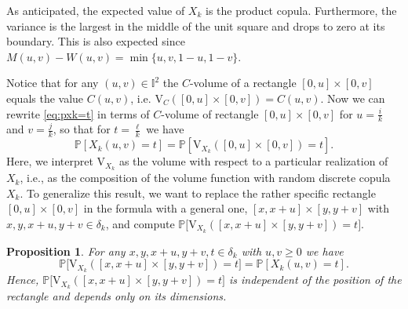 \documentclass[12pt,a4paper]{amsart}
\newtheorem{proposition}[theorem]{Proposition}
\theoremstyle{definition}
\newcommand{\II}{\mathbb{I}}
\newcommand{\dk}{\delta_k}
\newcommand{\PP}{\mathbb{P}}
\newcommand{\vol}{\mathrm{V}}
\begin{document}
As anticipated, the expected value of $X_k$ is the product copula. Furthermore, the variance is the largest in the middle of the unit square and drops to zero at its boundary. This is also expected since $M(u,v)-W(u,v)=\min \{u,v,1-u,1-v\}$.

\medskip

Notice that for any $(u,v) \in \II^2$ the $C$-volume of a rectangle $[0,u]\times[0,v]$ equals the value $C(u,v)$, i.e. $\vol_C([0,u]\times[0,v])=C(u,v)$.
Now we can rewrite \eqref{eq:pxk=t} in terms of $C$-volume of rectangle $[0,u]\times[0,v]$ for $u=\tfrac{i}{k}$ and $v=\tfrac{j}{k}$, so that for $t=\tfrac{\ell}{k}$ we have
$$\PP[X_k(u,v)= t] = \PP[\vol_{X_k}([0,u]\times[0,v])=t].$$
Here, we interpret $\vol_{X_k}$ as the volume with respect to a particular realization of $X_k$, i.e., as the composition of the volume function with random discrete copula $X_k$.
To generalize this result, we want to replace the rather specific rectangle $[0,u]\times[0,v]$ in the formula with a general one, $[x,x+u]\times[y,y+v]$  with $x,y,x+u,y+v \in \dk$, and compute
$\PP\big[\vol_{X_k}([x,x+u]\times[y,y+v])=t\big]$.

\begin{proposition}
For any $x,y,x+u,y+v,t \in \dk$ with $u,v \ge 0$ we have
$$\PP\big[\vol_{X_k}([x,x+u]\times[y,y+v])=t\big] = \PP[X_k(u,v)=t].$$  
Hence,
$\PP\big[\vol_{X_k}([x,x+u]\times[y,y+v])=t\big]$ is independent of the position of the rectangle and depends only on its dimensions.
\end{proposition}
\end{document}
